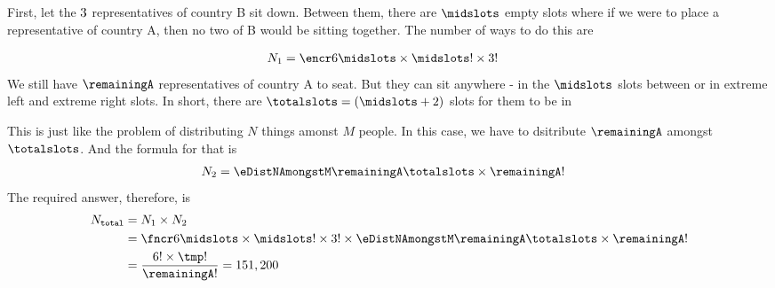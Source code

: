 
\watchout

\begin{solution}[\halfpage]
	\begin{fullwidth}
	First, let the $3$ representatives of country B sit down. Between them, there are $\midslots$ empty 
	slots where if we were to place a representative of country A, then no two of B would be sitting 
	together. The number of ways to do this are 
	
	\begin{align}
		N_1 &= \encr\vbone\midslots\times\midslots ! \times\vbtwo !
	\end{align}
	We still have $\remainingA$ representatives of country A to seat. But they can sit anywhere - 
	in the $\midslots$ slots between or in extreme left and extreme right slots. In short, there are 
	$\totalslots = (\midslots + 2)$ slots for them to be in 
	
	This is just like the problem of distributing $N$ things amonst $M$ people. In this case, we 
	have to dsitribute $\remainingA$ amongst $\totalslots$. And the formula for that is
	\begin{align}
		N_2 &= \eDistNAmongstM\remainingA\totalslots\times\remainingA !
	\end{align}
	The required answer, therefore, is 
	\begin{align}
		N_{\texttt{total}} &= N_1 \times N_2 \\ 
		&= \fncr\vbone\midslots\times\midslots ! \times\vbtwo ! \times \eDistNAmongstM\remainingA\totalslots\times\remainingA ! \\
		&= \dfrac{\vbone ! \times \tmp !}{\remainingA !} = \vbthree
	\end{align}
	\end{fullwidth}
\end{solution}

